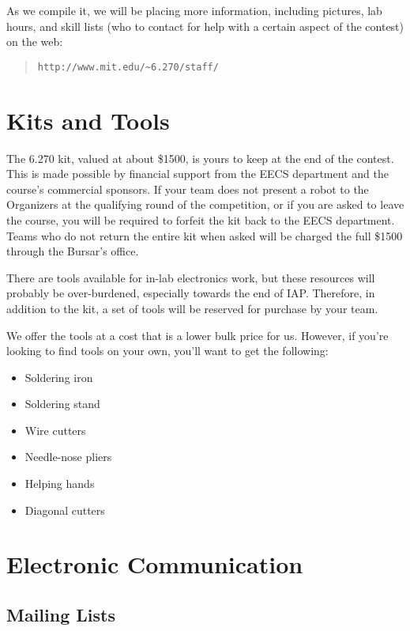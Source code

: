 As we compile it, we will be placing more information, including pictures, lab
hours, and skill lists (who to contact for help with a certain aspect of the
contest) on the web:

\begin{quote}
\begin{verbatim}
http://www.mit.edu/~6.270/staff/
\end{verbatim}
\end{quote}

\section{Kits and Tools}

The 6.270 kit, valued at about \$1500, is yours to keep at the end of the
contest. This is made possible by financial support from the EECS department and
the course's commercial sponsors. If your team does not present a robot to the
Organizers at the qualifying round of the competition, or if you are asked to
leave the course, you will be required to forfeit the kit back to the EECS
department.  Teams who do not return the entire kit when asked will be charged
the full \$1500 through the Bursar's office.

There are tools available for in-lab electronics work, but these resources will
probably be over-burdened, especially towards the end of IAP.  Therefore, in
addition to the kit, a set of tools will be reserved for purchase by your team.

We offer the tools at a cost that is a lower bulk price for us. However, if
you're looking to find tools on your own, you'll want to get the following:

\begin{itemize}
\item Soldering iron
\item Soldering stand
\item Wire cutters
\item Needle-nose pliers
\item Helping hands
\item Diagonal cutters
\end{itemize}

\section{Electronic Communication}

\subsection{Mailing Lists}

